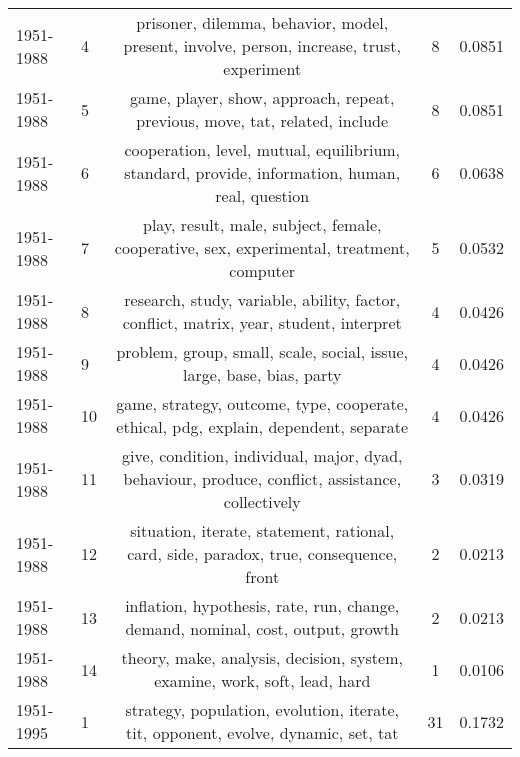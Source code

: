 \begin{tabular}{llccc}
 1951-1988 &               4 &                     prisoner, dilemma, behavior, model, present, involve, person, increase, trust, experiment &                8 &                  0.0851 \\
 1951-1988 &               5 &                                   game, player, show, approach, repeat, previous, move, tat, related, include &                8 &                  0.0851 \\
 1951-1988 &               6 &                cooperation, level, mutual, equilibrium, standard, provide, information, human, real, question &                6 &                  0.0638 \\
 1951-1988 &               7 &                      play, result, male, subject, female, cooperative, sex, experimental, treatment, computer &                5 &                  0.0532 \\
 1951-1988 &               8 &                        research, study, variable, ability, factor, conflict, matrix, year, student, interpret &                4 &                  0.0426 \\
 1951-1988 &               9 &                                         problem, group, small, scale, social, issue, large, base, bias, party &                4 &                  0.0426 \\
 1951-1988 &              10 &                          game, strategy, outcome, type, cooperate, ethical, pdg, explain, dependent, separate &                4 &                  0.0426 \\
 1951-1988 &              11 &              give, condition, individual, major, dyad, behaviour, produce, conflict, assistance, collectively &                3 &                  0.0319 \\
 1951-1988 &              12 &                        situation, iterate, statement, rational, card, side, paradox, true, consequence, front &                2 &                  0.0213 \\
 1951-1988 &              13 &                               inflation, hypothesis, rate, run, change, demand, nominal, cost, output, growth &                2 &                  0.0213 \\
 1951-1988 &              14 &                                     theory, make, analysis, decision, system, examine, work, soft, lead, hard &                1 &                  0.0106 \\
 \midrule
 1951-1995 &               1 &                            strategy, population, evolution, iterate, tit, opponent, evolve, dynamic, set, tat &               31 &                  0.1732 \\

\end{tabular}
